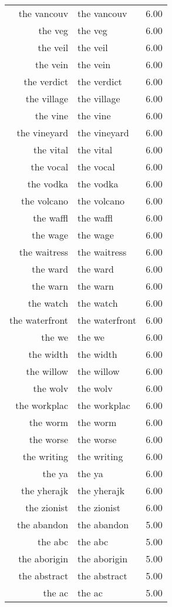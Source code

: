 \begin{table}[ht]
\begin{tabular}{rlr}
  the vancouv & the vancouv & 6.00 \\ 
  the veg & the veg & 6.00 \\ 
  the veil & the veil & 6.00 \\ 
  the vein & the vein & 6.00 \\ 
  the verdict & the verdict & 6.00 \\ 
  the village & the village & 6.00 \\ 
  the vine & the vine & 6.00 \\ 
  the vineyard & the vineyard & 6.00 \\ 
  the vital & the vital & 6.00 \\ 
  the vocal & the vocal & 6.00 \\ 
  the vodka & the vodka & 6.00 \\ 
  the volcano & the volcano & 6.00 \\ 
  the waffl & the waffl & 6.00 \\ 
  the wage & the wage & 6.00 \\ 
  the waitress & the waitress & 6.00 \\ 
  the ward & the ward & 6.00 \\ 
  the warn & the warn & 6.00 \\ 
  the watch & the watch & 6.00 \\ 
  the waterfront & the waterfront & 6.00 \\ 
  the we & the we & 6.00 \\ 
  the width & the width & 6.00 \\ 
  the willow & the willow & 6.00 \\ 
  the wolv & the wolv & 6.00 \\ 
  the workplac & the workplac & 6.00 \\ 
  the worm & the worm & 6.00 \\ 
  the worse & the worse & 6.00 \\ 
  the writing & the writing & 6.00 \\ 
  the ya & the ya & 6.00 \\ 
  the yherajk & the yherajk & 6.00 \\ 
  the zionist & the zionist & 6.00 \\ 
  the abandon & the abandon & 5.00 \\ 
  the abc & the abc & 5.00 \\ 
  the aborigin & the aborigin & 5.00 \\ 
  the abstract & the abstract & 5.00 \\ 
  the ac & the ac & 5.00 \\ 

\end{tabular}
\end{table}
